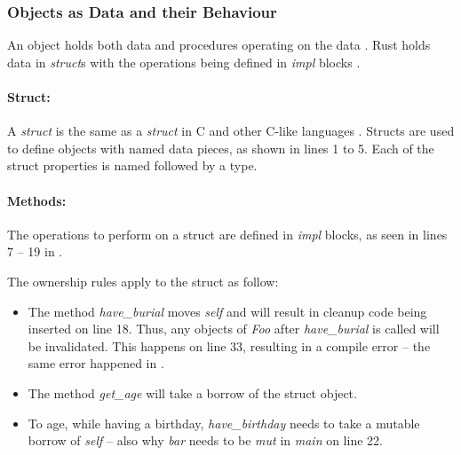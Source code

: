 \subsubsection{Objects as Data and their Behaviour}
An object holds both data and procedures operating on the data \cite{meyer_97_01,stefik_85_01,gamma_94_01,malik_09_01}.
Rust holds data in \textit{struct}s with the operations being defined in \textit{impl} blocks \cite{klabnik_2019_01}.

\paragraph{Struct:}
A \textit{struct} is the same as a \textit{struct} in C \cite{stroustrup_13_01} and other C-like languages \cite{robinson_04_01,savitch_15_01,malik_09_01}.
Structs are used to define objects with named data pieces, as shown in  lines 1 to 5.
Each of the struct properties is named followed by a type.

\paragraph{Methods:}
The operations to perform on a struct are defined in \textit{impl} blocks, as seen in lines 7 -- 19 in .

The ownership rules apply to the struct as follow:
\begin{itemize}
	\item The method \textit{have\_burial} moves \textit{self} and will result in cleanup code being inserted on line 18.
	      Thus, any objects of \textit{Foo} after \textit{have\_burial} is called will be invalidated.
	      This happens on line 33, resulting in a compile error -- the same error happened in .
	\item The method \textit{get\_age} will take a borrow of the struct object.
	\item To age, while having a birthday, \textit{have\_birthday} needs to take a mutable borrow of \textit{self} -- also why \textit{bar} needs to be \textit{mut} in \textit{main} on line 22.
\end{itemize}


\addtocounter{footnote}{1}
\addtocounter{footnote}{1}
\addtocounter{footnote}{1}

